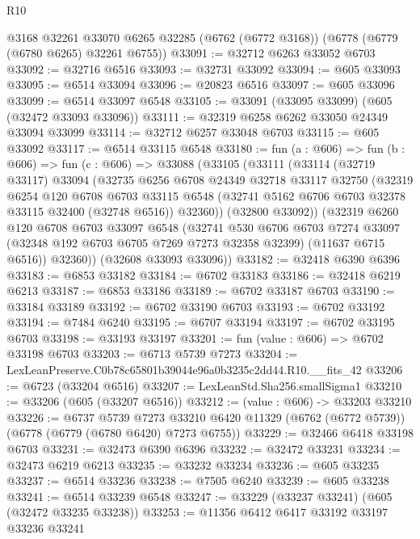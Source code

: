\begin{lexlean}{R10}
\begin{coremodule}
    @3168
    @32261
    @33070
    @6265
    @32285
    (@6762 (@6772 @3168))
    (@6778 (@6779 (@6780 @6265) @32261 @6755))
@33091 := @32712 @6263 @33052 @6703
@33092 := @32716 @6516
@33093 := @32731 @33092
@33094 := @605 @33093
@33095 := @6514 @33094
@33096 := @20823 @6516
@33097 := @605 @33096
@33099 := @6514 @33097 @6548
@33105 := @33091 (@33095 @33099) (@605 (@32472 @33093 @33096))
@33111 := @32319 @6258 @6262 @33050 @24349 @33094 @33099
@33114 := @32712 @6257 @33048 @6703
@33115 := @605 @33092
@33117 := @6514 @33115 @6548
@33180 := fun (a : @606) =>
  fun (b : @606) =>
  fun (c : @606) =>
  @33088
    (@33105
      (@33111
        (@33114
          (@32719 @33117)
          @33094
          (@32735
            @6256
            @6708
            @24349
            @32718
            @33117
            @32750
            (@32319
              @6254
              @120
              @6708
              @6703
              @33115
              @6548
              (@32741 @5162 @6706 @6703 @32378 @33115 @32400 (@32748 @6516))
              @32360))
          (@32800 @33092))
        (@32319
          @6260
          @120
          @6708
          @6703
          @33097
          @6548
          (@32741
            @530
            @6706
            @6703
            @7274
            @33097
            (@32348 @192 @6703 @6705 @7269 @7273 @32358 @32399)
            (@11637 @6715 @6516))
          @32360))
      (@32608 @33093 @33096))
@33182 := @32418 @6390 @6396
@33183 := @6853 @33182
@33184 := @6702 @33183
@33186 := @32418 @6219 @6213
@33187 := @6853 @33186
@33189 := @6702 @33187 @6703
@33190 := @33184 @33189
@33192 := @6702 @33190 @6703
@33193 := @6702 @33192
@33194 := @7484 @6240
@33195 := @6707 @33194
@33197 := @6702 @33195 @6703
@33198 := @33193 @33197
@33201 := fun (value : @606) => @6702 @33198 @6703
@33203 := @6713 @5739 @7273
@33204 := LexLeanPreserve.C0b78c65801b39044e96a0b3235c2dd44.R10.__fits_42
@33206 := @6723 (@33204 @6516)
@33207 := LexLeanStd.Sha256.smallSigma1
@33210 := @33206 (@605 (@33207 @6516))
@33212 := (value : @606) -> @33203 @33210
@33226 := @6737
    @5739
    @7273
    @33210
    @6420
    @11329
    (@6762 (@6772 @5739))
    (@6778 (@6779 (@6780 @6420) @7273 @6755))
@33229 := @32466 @6418 @33198 @6703
@33231 := @32473 @6390 @6396
@33232 := @32472 @33231
@33234 := @32473 @6219 @6213
@33235 := @33232 @33234
@33236 := @605 @33235
@33237 := @6514 @33236
@33238 := @7505 @6240
@33239 := @605 @33238
@33241 := @6514 @33239 @6548
@33247 := @33229 (@33237 @33241) (@605 (@32472 @33235 @33238))
@33253 := @11356 @6412 @6417 @33192 @33197 @33236 @33241

\end{coremodule}
\end{lexlean}
